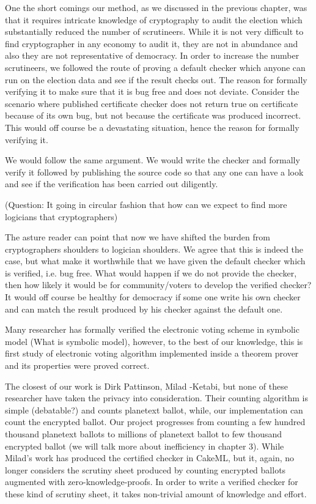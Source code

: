   One the short comings our method, as we discussed in the previous chapter, 
  was that it requires intricate knowledge of cryptography to audit the election
  which substantially reduced the number of scrutineers. 
  While it is not very difficult to find cryptographer in any economy to 
  audit it, they are not in abundance and also they are not representative 
  of democracy.  In order to increase the number scrutineers, we followed 
  the route of proving a default checker which anyone can run on the 
  election data and see if the result checks out.  The reason 
  for formally verifying it to make sure that it is bug free and does not 
  deviate. Consider the scenario where published certificate checker 
  does not return true on certificate because of its own bug, but not 
  because the certificate was produced incorrect. This would off course 
  be a devastating situation, hence the reason for formally verifying it. 
  
  We would follow the same argument. We would write the checker and 
  formally verify it followed by publishing the source code so that 
  any one can have a look and see if the verification has been carried out 
  diligently.  
  
  (Question: It going in circular fashion that how can we expect to find 
  more logicians that cryptographers)
  
  The asture reader can point that now we have shifted the burden 
  from cryptographers shoulders to logician shoulders. We agree 
  that this is indeed the case, but what make it worthwhile that 
  we have given the default checker which is verified, i.e. bug free. 
  What would happen if we do not provide the checker, then how 
  likely it would be for community/voters to develop the 
  verified checker? It would off course be healthy for democracy 
  if some one write his own checker and can match the result 
  produced by his checker against the default one. 
  
  


 Many researcher has formally verified the electronic voting scheme in symbolic model (What is symbolic model), 
 however, to the best of our knowledge, this is first study of electronic voting algorithm implemented 
 inside a theorem prover and its properties were proved correct. 
 
 The closest of our work is Dirk Pattinson, Milad -Ketabi, but none of these researcher have taken 
 the privacy into consideration. Their counting algorithm is simple (debatable?) and counts 
 planetext ballot, while, our implementation can count the encrypted ballot. 
 Our project progresses from counting a few hundred thousand planetext 
 ballots to millions of planetext ballot to few thousand encrypted ballot (we will talk more about 
 inefficiency in chapter 3). While Milad's work has produced the certified checker in CakeML, but it, 
 again, no longer considers the scrutiny sheet produced by counting encrypted ballots 
 augmented with zero-knowledge-proofs.  In order to write a verified checker 
 for these kind of scrutiny sheet, it takes non-trivial amount of knowledge and effort. 
 
